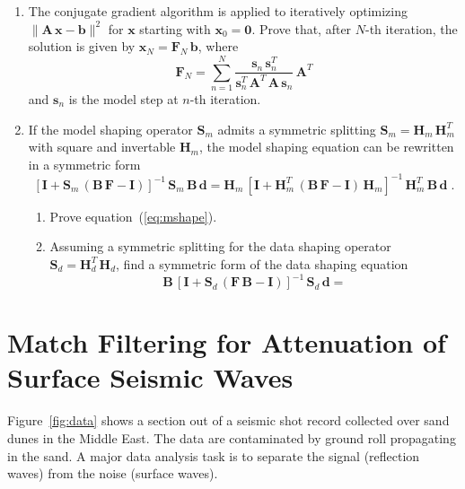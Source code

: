 \begin{enumerate}
\item The conjugate gradient algorithm is applied to iteratively optimizing $\|\mathbf{A\,x-b}\|^2$ for $\mathbf{x}$ starting with $\mathbf{x}_0=\mathbf{0}$. Prove that, after $N$-th iteration, the solution is given by $\mathbf{x}_N = \mathbf{F}_N\,\mathbf{b}$, where
\begin{equation}
\label{eq:cn}
\mathbf{F}_N = \sum\limits_{n=1}^{N} \frac{\mathbf{s}_n\,\mathbf{s}_n^T}{\mathbf{s}_n^T\,\mathbf{A}^T\,\mathbf{A}\,\mathbf{s}_n}\,\mathbf{A}^T
\end{equation}
and $\mathbf{s}_n$ is the model step at $n$-th iteration.
\item If the model shaping operator $\mathbf{S}_m$ admits a
symmetric splitting $\mathbf{S}_m=\mathbf{H}_m\,\mathbf{H}_m^T$ with square and invertable
$\mathbf{H}_m$, the model shaping equation can be rewritten in a symmetric form
\begin{equation}
\label{eq:mshape}
\left[\mathbf{I} + \mathbf{S}_m\,(\mathbf{B\,F - I})\right]^{-1}\,\mathbf{S}_m\,\mathbf{B\,d} 
= \mathbf{H}_m\,\left[\mathbf{I} + \mathbf{H}_m^T\,(\mathbf{B\,F - I})\,\mathbf{H}_m\right]^{-1}\,\mathbf{H}_m^T\,\mathbf{B\,d}\;.
\end{equation}
\begin{enumerate}
\item Prove equation~(\ref{eq:mshape}).
\item Assuming a symmetric splitting for the data shaping operator $\mathbf{S}_d=\mathbf{H}_d^T\,\mathbf{H}_d$, find a symmetric form of the data shaping equation
\begin{equation}
\label{eq:dshape}
\mathbf{B}\,\left[\mathbf{I} + \mathbf{S}_d\,(\mathbf{F\,B - I})\right]^{-1}\, \mathbf{S}_d\,\mathbf{d} =
\end{equation}
\end{enumerate}
\end{enumerate}

\section{Match Filtering for Attenuation of Surface Seismic Waves}


Figure~\ref{fig:data} shows a section out of a seismic shot record
collected over sand dunes in the Middle East. The data are
contaminated by ground roll propagating in the sand. A major data
analysis task is to separate the signal (reflection waves) from the
noise (surface waves).

